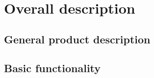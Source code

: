 \section{Overall description}


\subsection{General product description}

\subsection{Basic functionality}